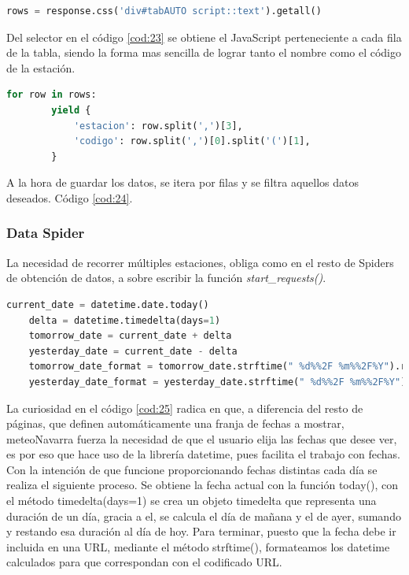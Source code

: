 \begin{lstlisting}[language=Python, caption={Selector en \textit{parse()} de MeteoNavarra Code Spider}, label=cod:23]
	rows = response.css('div#tabAUTO script::text').getall()
\end{lstlisting}

Del selector en el código \ref{cod:23} se obtiene el JavaScript perteneciente a cada fila de la tabla, siendo la forma mas sencilla de lograr tanto el nombre como el código de la estación.

\begin{lstlisting}[language=Python, caption={Guardado de datos de MeteoNavarra Code Spider}, label=cod:24]	
	for row in rows:
		yield {
			'estacion': row.split(',')[3],
			'codigo': row.split(',')[0].split('(')[1],
		}
\end{lstlisting}

A la hora de guardar los datos, se itera por filas y se filtra aquellos datos deseados. Código \ref{cod:24}.

\subsubsection{Data Spider}
La necesidad de recorrer múltiples estaciones, obliga como en el resto de Spiders de obtención de datos, a sobre escribir la función \textit{start\_requests()}.

\begin{lstlisting}[language=Python, caption={Uso de fechas en función \textit{start\_requests()} MeteoNavarra Data Spider}, label=cod:25]
	current_date = datetime.date.today()
	delta = datetime.timedelta(days=1)
	tomorrow_date = current_date + delta
	yesterday_date = current_date - delta
	tomorrow_date_format = tomorrow_date.strftime(" %d%%2F %m%%2F%Y").replace(' 0', '')
	yesterday_date_format = yesterday_date.strftime(" %d%%2F %m%%2F%Y").replace(' 0', '')
\end{lstlisting}

La curiosidad en el código \ref{cod:25} radica en que, a diferencia del resto de páginas, que definen automáticamente una franja de fechas a mostrar, meteoNavarra fuerza la necesidad de que el usuario elija las fechas que desee ver, es por eso que hace uso de la librería datetime, pues facilita el trabajo con fechas.\newline
\newline
Con la intención de que funcione proporcionando fechas distintas cada día se realiza el siguiente proceso. Se obtiene la fecha actual con la función today(), con el método timedelta(days=1) se crea un objeto timedelta que representa una duración de un día, gracia a el, se calcula el día de mañana y el de ayer, sumando y restando esa duración al día de hoy. Para terminar, puesto que la fecha debe ir incluida en una URL, mediante el método strftime(), formateamos los datetime calculados para que correspondan con el codificado URL.\newline
\newline

